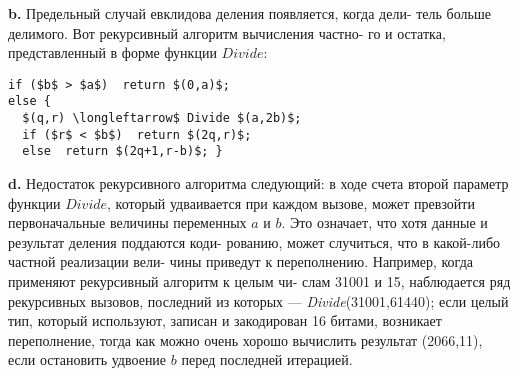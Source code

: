 \textbf{b.} Предельный случай евклидова деления появляется, когда дели-\linebreak
тель больше делимого. Вот рекурсивный алгоритм вычисления частно-\linebreak
го и остатка, представленный в форме функции $Divide$:
\begin{lstlisting}[frame=single, mathescape=true]
if ($b$ > $a$)  return $(0,a)$;
else {
  $(q,r) \longleftarrow$ Divide $(a,2b)$;
  if ($r$ < $b$)  return $(2q,r)$;
  else  return $(2q+1,r-b)$; }
\end{lstlisting}
\hspace*{15pt}\textbf{d.} Недостаток рекурсивного алгоритма следующий: в ходе счета\linebreak
второй параметр функции $Divide$, который удваивается при каждом\linebreak
вызове, может превзойти первоначальные величины переменных $a$ и $b$.\linebreak
Это означает, что хотя данные и результат деления поддаются коди-\linebreak
рованию, может случиться, что в какой-либо частной реализации вели-\linebreak
чины приведут к переполнению.\newline
\hspace*{15pt}Например, когда применяют рекурсивный алгоритм к целым чи-\linebreak
слам 31001 и 15, наблюдается ряд рекурсивных вызовов, последний из\linebreak
которых — \textit{Divide}(31001,61440); если целый тип, который используют,\linebreak
записан и закодирован 16 битами, возникает переполнение, тогда как\linebreak
можно очень хорошо вычислить результат (2066,11), если остановить\linebreak
удвоение $b$ перед последней итерацией.\newline
